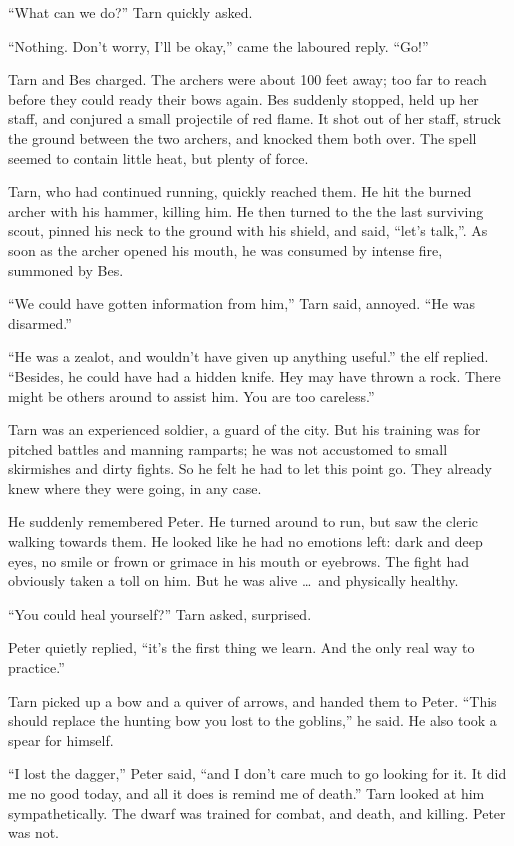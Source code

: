 ``What can we do?'' Tarn quickly asked.

``Nothing.  Don't worry, I'll be okay,'' came the laboured reply.  ``Go!''

Tarn and Bes charged.  The archers were about 100 feet away; too far to reach before they could ready their bows again.  Bes suddenly stopped, held up her staff, and conjured a small projectile of red flame.  It shot out of her staff, struck the ground between the two archers, and knocked them both over.  The spell seemed to contain little heat, but plenty of force.

Tarn, who had continued running, quickly reached them.  He hit the burned archer with his hammer, killing him.  He then turned to the the last surviving scout, pinned his neck to the ground with his shield, and said, ``let's talk,''.  As soon as the archer opened his mouth, he was consumed by intense fire, summoned by Bes.

``We could have gotten information from him,'' Tarn said, annoyed.  ``He was disarmed.''

``He was a zealot, and wouldn't have given up anything useful.''  the elf replied.  ``Besides, he could have had a hidden knife.  Hey may have thrown a rock.  There might be others around to assist him.  You are too careless.''

Tarn was an experienced soldier, a guard of the city.  But his training was for pitched battles and manning ramparts; he was not accustomed to small skirmishes and dirty fights.  So he felt he had to let this point go.  They already knew where they were going, in any case.

He suddenly remembered Peter.  He turned around to run, but saw the cleric walking towards them.  He looked like he had no emotions left: dark and deep eyes, no smile or frown or grimace in his mouth or eyebrows.  The fight had obviously taken a toll on him.  But he was alive \ldots\ and physically healthy.

``You could heal yourself?'' Tarn asked, surprised.

Peter quietly replied, ``it's the first thing we learn.  And the only real way to practice.''

Tarn picked up a bow and a quiver of arrows, and handed them to Peter.  ``This should replace the hunting bow you lost to the goblins,'' he said.  He also took a spear for himself.

``I lost the dagger,'' Peter said, ``and I don't care much to go looking for it.  It did me no good today, and all it does is remind me of death.''  Tarn looked at him sympathetically.  The dwarf was trained for combat, and death, and killing.  Peter was not.




